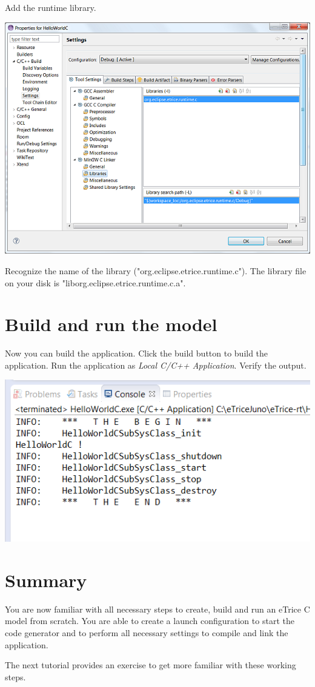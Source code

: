Add the runtime library.

\includegraphics{images/034-HelloWorldC15.png}

Recognize the name of the library ("org.eclipse.etrice.runtime.c"). The library file on your disk is 
"liborg.eclipse.etrice.runtime.c.a". 

\section{Build and run the model}

Now you can build the application. Click the build button to build the application.
Run the application as \textit{Local C/C++ Application}.
Verify the output.

\includegraphics{images/034-HelloWorldC16.png}

\section{Summary}

You are now familiar with all necessary steps to create, build and run an eTrice C model from scratch. You 
are able to create a launch configuration to start the code generator and to perform all necessary 
settings to compile and link the application.  

The next tutorial provides an exercise to get more familiar with these working steps.
